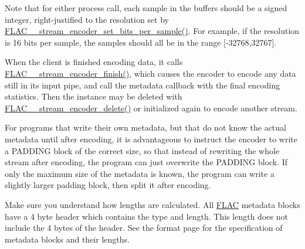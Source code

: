 Note that for either process call, each sample in the buffers should be a signed integer, right-\/justified to the resolution set by \hyperlink{group__flac__stream__encoder_ga5a21cf7f86a81df6ba72714a6b917aa3}{F\+L\+A\+C\+\_\+\+\_\+stream\+\_\+encoder\+\_\+set\+\_\+bits\+\_\+per\+\_\+sample()}. For example, if the resolution is 16 bits per sample, the samples should all be in the range \mbox{[}-\/32768,32767\mbox{]}.

When the client is finished encoding data, it calls \hyperlink{group__flac__stream__encoder_gab2c1e5477c1e3fe9ad0d722ff8eecda2}{F\+L\+A\+C\+\_\+\+\_\+stream\+\_\+encoder\+\_\+finish()}, which causes the encoder to encode any data still in its input pipe, and call the metadata callback with the final encoding statistics. Then the instance may be deleted with \hyperlink{group__flac__stream__encoder_ga9c9956af42bebe923da59437628aa9ea}{F\+L\+A\+C\+\_\+\+\_\+stream\+\_\+encoder\+\_\+delete()} or initialized again to encode another stream.

For programs that write their own metadata, but that do not know the actual metadata until after encoding, it is advantageous to instruct the encoder to write a P\+A\+D\+D\+I\+NG block of the correct size, so that instead of rewriting the whole stream after encoding, the program can just overwrite the P\+A\+D\+D\+I\+NG block. If only the maximum size of the metadata is known, the program can write a slightly larger padding block, then split it after encoding.

Make sure you understand how lengths are calculated. All \hyperlink{namespace_f_l_a_c}{F\+L\+AC} metadata blocks have a 4 byte header which contains the type and length. This length does not include the 4 bytes of the header. See the format page for the specification of metadata blocks and their lengths.

